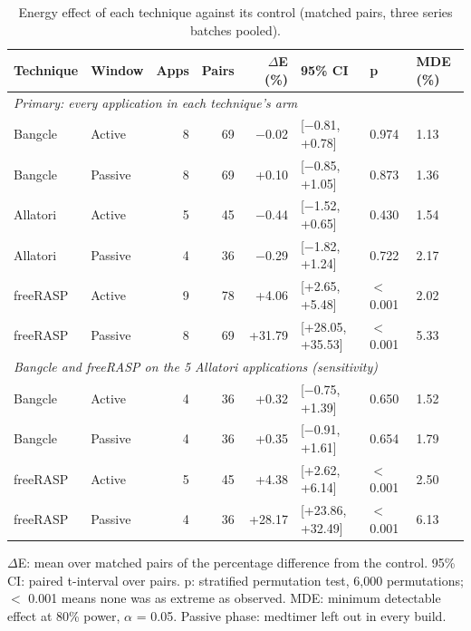 \begin{table}[t]
\centering
\small
\caption{Energy effect of each technique against its control (matched pairs, three series batches pooled).}
\label{tab:main-results}
\begin{tabular}{llrrrlll}
\toprule
\textbf{Technique} & \textbf{Window} & \textbf{Apps} & \textbf{Pairs} & \textbf{$\Delta$E (\%)} & \textbf{95\% CI} & \textbf{p} & \textbf{MDE (\%)} \\
\midrule
\multicolumn{8}{l}{\textit{Primary: every application in each technique's arm}} \\
Bangcle & Active & 8 & 69 & $-$0.02 & [$-$0.81, +0.78] & 0.974 & 1.13 \\
Bangcle & Passive & 8 & 69 & +0.10 & [$-$0.85, +1.05] & 0.873 & 1.36 \\
Allatori & Active & 5 & 45 & $-$0.44 & [$-$1.52, +0.65] & 0.430 & 1.54 \\
Allatori & Passive & 4 & 36 & $-$0.29 & [$-$1.82, +1.24] & 0.722 & 2.17 \\
freeRASP & Active & 9 & 78 & +4.06 & [+2.65, +5.48] & $<$ 0.001 & 2.02 \\
freeRASP & Passive & 8 & 69 & +31.79 & [+28.05, +35.53] & $<$ 0.001 & 5.33 \\
\midrule
\multicolumn{8}{l}{\textit{Bangcle and freeRASP on the 5 Allatori applications (sensitivity)}} \\
Bangcle & Active & 4 & 36 & +0.32 & [$-$0.75, +1.39] & 0.650 & 1.52 \\
Bangcle & Passive & 4 & 36 & +0.35 & [$-$0.91, +1.61] & 0.654 & 1.79 \\
freeRASP & Active & 5 & 45 & +4.38 & [+2.62, +6.14] & $<$ 0.001 & 2.50 \\
freeRASP & Passive & 4 & 36 & +28.17 & [+23.86, +32.49] & $<$ 0.001 & 6.13 \\
\bottomrule
\end{tabular}
\par\smallskip\footnotesize $\Delta$E: mean over matched pairs of the percentage difference from the control. 95\% CI: paired t-interval over pairs. p: stratified permutation test, 6,000 permutations; $<$ 0.001 means none was as extreme as observed. MDE: minimum detectable effect at 80\% power, $\alpha$ = 0.05. Passive phase: medtimer left out in every build.
\end{table}
